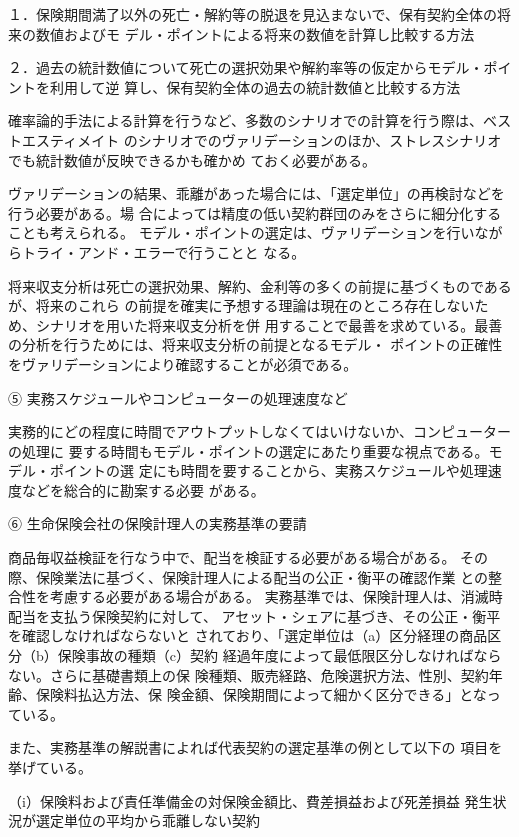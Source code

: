 \documentclass[report,gutter=10mm,fore-edge=10mm,uplatex,dvipdfmx]{jlreq}
\begin{document}
１．保険期間満了以外の死亡・解約等の脱退を見込まないで、保有契約全体の将来の数値およびモ
デル・ポイントによる将来の数値を計算し比較する方法

２．過去の統計数値について死亡の選択効果や解約率等の仮定からモデル・ポイントを利用して逆
算し、保有契約全体の過去の統計数値と比較する方法

確率論的手法による計算を行うなど、多数のシナリオでの計算を行う際は、ベストエスティメイト
のシナリオでのヴァリデーションのほか、ストレスシナリオでも統計数値が反映できるかも確かめ
ておく必要がある。

ヴァリデーションの結果、乖離があった場合には、「選定単位」の再検討などを行う必要がある。場
合によっては精度の低い契約群団のみをさらに細分化することも考えられる。
モデル・ポイントの選定は、ヴァリデーションを行いながらトライ・アンド・エラーで行うことと
なる。

将来収支分析は死亡の選択効果、解約、金利等の多くの前提に基づくものであるが、将来のこれら
の前提を確実に予想する理論は現在のところ存在しないため、シナリオを用いた将来収支分析を併
用することで最善を求めている。最善の分析を行うためには、将来収支分析の前提となるモデル・
ポイントの正確性をヴァリデーションにより確認することが必須である。

⑤ 実務スケジュールやコンピューターの処理速度など

実務的にどの程度に時間でアウトプットしなくてはいけないか、コンピューターの処理に
要する時間もモデル・ポイントの選定にあたり重要な視点である。モデル・ポイントの選
定にも時間を要することから、実務スケジュールや処理速度などを総合的に勘案する必要
がある。


⑥ 生命保険会社の保険計理人の実務基準の要請

商品毎収益検証を行なう中で、配当を検証する必要がある場合がある。
その際、保険業法に基づく、保険計理人による配当の公正・衡平の確認作業
との整合性を考慮する必要がある場合がある。
実務基準では、保険計理人は、消滅時配当を支払う保険契約に対して、
アセット・シェアに基づき、その公正・衡平を確認しなければならないと
されており、「選定単位は（a）区分経理の商品区分（b）保険事故の種類（c）契約
経過年度によって最低限区分しなければならない。さらに基礎書類上の保
険種類、販売経路、危険選択方法、性別、契約年齢、保険料払込方法、保
険金額、保険期間によって細かく区分できる」となっている。

また、実務基準の解説書によれば代表契約の選定基準の例として以下の
項目を挙げている。

（i）保険料および責任準備金の対保険金額比、費差損益および死差損益
発生状況が選定単位の平均から乖離しない契約
\end{document}
